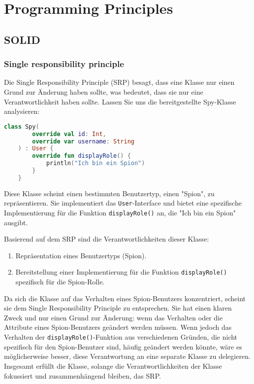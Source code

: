 \chapter{Programming Principles}


\section{SOLID}

\subsection*{Single responsibility principle}

Die Single Responsibility Principle (SRP) besagt, dass eine Klasse nur einen Grund zur Änderung haben sollte, was bedeutet, dass sie nur eine Verantwortlichkeit haben sollte. Lassen Sie uns die bereitgestellte Spy-Klasse analysieren:\\

\begin{lstlisting}[language=Kotlin]
    class Spy(
        override val id: Int,
        override var username: String
    ) : User {
        override fun displayRole() {
            println("Ich bin ein Spion")
        }
    }
\end{lstlisting}

Diese Klasse scheint einen bestimmten Benutzertyp, einen "Spion", zu repräsentieren. Sie implementiert das \texttt{User}-Interface und bietet eine spezifische Implementierung für die Funktion \texttt{displayRole()} an, die "Ich bin ein Spion" ausgibt.

Basierend auf dem SRP sind die Verantwortlichkeiten dieser Klasse:

\begin{enumerate}
    \item Repräsentation eines Benutzertyps (Spion).
    \item Bereitstellung einer Implementierung für die Funktion \texttt{displayRole()} spezifisch für die Spion-Rolle.
\end{enumerate}

Da sich die Klasse auf das Verhalten eines Spion-Benutzers konzentriert, scheint sie dem Single Responsibility Principle zu entsprechen. Sie hat einen klaren Zweck und nur einen Grund zur Änderung: wenn das Verhalten oder die Attribute eines Spion-Benutzers geändert werden müssen. Wenn jedoch das Verhalten der \texttt{displayRole()}-Funktion aus verschiedenen Gründen, die nicht spezifisch für den Spion-Benutzer sind, häufig geändert werden könnte, wäre es möglicherweise besser, diese Verantwortung an eine separate Klasse zu delegieren. Insgesamt erfüllt die Klasse, solange die Verantwortlichkeiten der Klasse fokussiert und zusammenhängend bleiben, das SRP.




